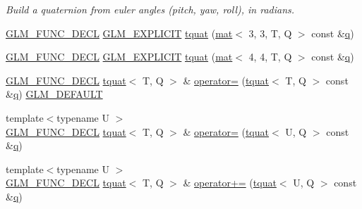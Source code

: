 \begin{DoxyCompactItemize}
\begin{DoxyCompactList}\small\item\em Build a quaternion from euler angles (pitch, yaw, roll), in radians. \end{DoxyCompactList}\item 
\mbox{\hyperlink{setup_8hpp_ab2d052de21a70539923e9bcbf6e83a51}{G\+L\+M\+\_\+\+F\+U\+N\+C\+\_\+\+D\+E\+CL}} \mbox{\hyperlink{setup_8hpp_a6c74f5a5e7b134ab69023ff9a30d4d5d}{G\+L\+M\+\_\+\+E\+X\+P\+L\+I\+C\+IT}} \mbox{\hyperlink{structglm_1_1tquat_a38ce1c324ea9484c6d4f73785c9bea35}{tquat}} (\mbox{\hyperlink{structglm_1_1mat}{mat}}$<$ 3, 3, T, Q $>$ const \&\mbox{\hyperlink{_s_d_l__opengl_8h_a8fc1e7b9baaae687804c7eed46ca09c6}{q}})
\item 
\mbox{\hyperlink{setup_8hpp_ab2d052de21a70539923e9bcbf6e83a51}{G\+L\+M\+\_\+\+F\+U\+N\+C\+\_\+\+D\+E\+CL}} \mbox{\hyperlink{setup_8hpp_a6c74f5a5e7b134ab69023ff9a30d4d5d}{G\+L\+M\+\_\+\+E\+X\+P\+L\+I\+C\+IT}} \mbox{\hyperlink{structglm_1_1tquat_adf5a3881bf63586dd6a1c26f59fee6c8}{tquat}} (\mbox{\hyperlink{structglm_1_1mat}{mat}}$<$ 4, 4, T, Q $>$ const \&\mbox{\hyperlink{_s_d_l__opengl_8h_a8fc1e7b9baaae687804c7eed46ca09c6}{q}})
\item 
\mbox{\hyperlink{setup_8hpp_ab2d052de21a70539923e9bcbf6e83a51}{G\+L\+M\+\_\+\+F\+U\+N\+C\+\_\+\+D\+E\+CL}} \mbox{\hyperlink{structglm_1_1tquat}{tquat}}$<$ T, Q $>$ \& \mbox{\hyperlink{structglm_1_1tquat_a2f7cf076f1398d0190228255239d9cc0}{operator=}} (\mbox{\hyperlink{structglm_1_1tquat}{tquat}}$<$ T, Q $>$ const \&\mbox{\hyperlink{_s_d_l__opengl_8h_a8fc1e7b9baaae687804c7eed46ca09c6}{q}}) \mbox{\hyperlink{setup_8hpp_aefce7051c376a64ba89fa93a9f63bc2c}{G\+L\+M\+\_\+\+D\+E\+F\+A\+U\+LT}}
\item 
{\footnotesize template$<$typename U $>$ }\\\mbox{\hyperlink{setup_8hpp_ab2d052de21a70539923e9bcbf6e83a51}{G\+L\+M\+\_\+\+F\+U\+N\+C\+\_\+\+D\+E\+CL}} \mbox{\hyperlink{structglm_1_1tquat}{tquat}}$<$ T, Q $>$ \& \mbox{\hyperlink{structglm_1_1tquat_ab460ca35b5d2a4afe8fc79106943f456}{operator=}} (\mbox{\hyperlink{structglm_1_1tquat}{tquat}}$<$ U, Q $>$ const \&\mbox{\hyperlink{_s_d_l__opengl_8h_a8fc1e7b9baaae687804c7eed46ca09c6}{q}})
\item 
{\footnotesize template$<$typename U $>$ }\\\mbox{\hyperlink{setup_8hpp_ab2d052de21a70539923e9bcbf6e83a51}{G\+L\+M\+\_\+\+F\+U\+N\+C\+\_\+\+D\+E\+CL}} \mbox{\hyperlink{structglm_1_1tquat}{tquat}}$<$ T, Q $>$ \& \mbox{\hyperlink{structglm_1_1tquat_af04015f0ca99c3792a7af3061d3508bb}{operator+=}} (\mbox{\hyperlink{structglm_1_1tquat}{tquat}}$<$ U, Q $>$ const \&\mbox{\hyperlink{_s_d_l__opengl_8h_a8fc1e7b9baaae687804c7eed46ca09c6}{q}})

\end{DoxyCompactItemize}
